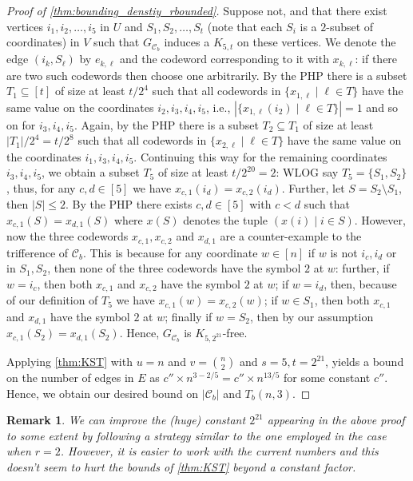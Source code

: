 \documentclass[10pt,a4paper]{article}
\newcommand{\calC}{\mathcal{C}}
\newcommand{\set}[1]{\{#1\}}
\newtheorem{remark}[theorem]{Remark}
\DeclareMathOperator{\1}{\mathbf{1}}
\begin{document}
\begin{proof}[Proof of \cref{thm:bounding_denstiy_rbounded}]
	Suppose not, and that there exist vertices $i_1,i_2,\ldots,i_5$ in $U$ and $S_1,S_2,\ldots,S_t$ (note that each $S_i$ is a $2$-subset of coordinates) in $V$ such that $G_{\calC_b}$ induces a $K_{5,t}$ on these vertices.
We denote the edge $(i_k, S_\ell)$ by $e_{k,\ell}$ and the codeword corresponding to it with $x_{k,\ell}$: if there are two such codewords then choose one arbitrarily.
	By the PHP there is a subset $T_1\subseteq[t]$ of size at least $t/2^4$ such that all codewords in $\set{x_{1,\ell}\mid \ell \in T}$ have the same value on the coordinates $i_2,i_3,i_4,i_5$, i.e.,  $|\set{x_{1,\ell}(i_2)\mid \ell \in T}|=1$ and so on for $i_3,i_4,i_5$.
	Again, by the PHP there is a subset $T_2\subseteq T_1$ of size at least $|T_1|/2^4=t/2^8$ such that all codewords in $\set{x_{2,\ell}\mid \ell \in T}$ have the same value on the coordinates $i_1,i_3,i_4,i_5$.
	Continuing this way for the remaining coordinates $i_3,i_4,i_5$, we obtain a subset $T_5$ of size at least $t/2^{20} = 2$:
	WLOG say $T_5=\set{S_1,S_2}$, thus, for any $c,d \in [5]$ we have $x_{c,1}(i_d) = x_{c,2}(i_d)$.
	Further, let $S = S_2\setminus S_1$, then $|S|\leq 2$. 
	By the PHP there exists $c,d\in [5]$ with $c<d$ such that $x_{c,1}(S) = x_{d,1}(S)$ where  $x(S)$ denotes the tuple $(x(i)\mid i\in S)$. 
	However, now the three codewords $x_{c,1},x_{c,2}$ and $x_{d,1}$  are a counter-example to the trifference of $\calC_b$.
	This is because for any coordinate $w\in [n]$ if $w$ is not $i_c,i_d$ or in $S_1,S_2$, then none of the three codewords have the symbol $2$ at $w$: further, if $w=i_c$, then both $x_{c,1}$ and $x_{c,2}$ have the symbol $2$ at $w$; if $w=i_d$, then, because of our definition of $T_5$ we have $x_{c,1}(w) = x_{c,2}(w)$; if $w\in S_1$, then both $x_{c,1}$ and $x_{d,1}$ have the symbol $2$ at $w$; finally if $w=S_2$, then by our assumption $x_{c,1}(S_2)=x_{d,1}(S_2)$. 
	Hence, $G_{\calC_b}$ is $K_{5,2^{21}}$-free.

	Applying \cref{thm:KST} with $u=n$ and $v=\binom{n}{2}$ and $s=5,t=2^{21}$, yields a bound on the number of edges in $E$ as $c''\times n^{3-2/5}=c''\times n^{13/5}$ for some constant $c''$.
	Hence, we obtain our desired bound on $|\calC_b|$ and $T_b(n,3)$.
\end{proof}

\begin{remark}
	We can improve the (huge) constant $2^{21}$ appearing in the above proof to some extent by following a strategy similar to the one employed in the case when $r=2$.
	However, it is easier to work with the current numbers and this doesn't seem to hurt the bounds of \cref{thm:KST} beyond a constant factor.
\end{remark}
\end{document}
